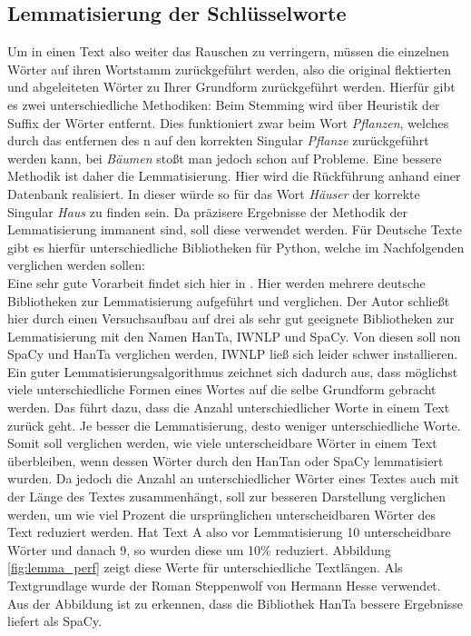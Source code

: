 \subsection{Lemmatisierung der Schlüsselworte}
Um in einen Text also weiter das Rauschen zu verringern, müssen die einzelnen Wörter auf ihren Wortstamm zurückgeführt werden, also die original flektierten und abgeleiteten Wörter zu Ihrer Grundform zurückgeführt werden. Hierfür gibt es zwei unterschiedliche Methodiken: Beim Stemming wird über Heuristik der Suffix der Wörter entfernt. Dies funktioniert zwar beim Wort \textit{Pflanzen}, welches durch das entfernen des n auf den korrekten Singular \textit{Pflanze} zurückgeführt werden kann, bei \textit{Bäumen} stoßt man jedoch schon auf Probleme. Eine bessere Methodik ist daher die Lemmatisierung. Hier wird die Rückführung anhand einer Datenbank realisiert. In dieser würde so für das Wort \textit{Häuser} der korrekte Singular \textit{Haus} zu finden sein. Da präzisere Ergebnisse der Methodik der Lemmatisierung immanent sind, soll diese verwendet werden. Für Deutsche Texte gibt es hierfür unterschiedliche Bibliotheken für Python, welche im Nachfolgenden verglichen werden sollen: \\ \newline
Eine sehr gute Vorarbeit findet sich hier in \cite{lemma}. Hier werden mehrere deutsche Bibliotheken zur Lemmatisierung aufgeführt und verglichen. Der Autor schließt hier durch einen Versuchsaufbau auf drei als sehr gut geeignete Bibliotheken zur Lemmatisierung mit den Namen HanTa, IWNLP  und SpaCy. Von diesen soll non SpaCy und HanTa verglichen werden, IWNLP ließ sich leider schwer installieren.\\ \newline
Ein guter Lemmatisierungsalgorithmus zeichnet sich dadurch aus, dass möglichst viele unterschiedliche Formen eines Wortes auf die selbe Grundform gebracht werden. Das führt dazu, dass die Anzahl unterschiedlicher Worte in einem Text zurück geht. Je besser die Lemmatisierung, desto weniger unterschiedliche Worte. Somit soll verglichen werden, wie viele unterscheidbare Wörter in einem Text überbleiben, wenn dessen Wörter durch den HanTan oder SpaCy lemmatisiert wurden. Da jedoch die Anzahl an unterschiedlicher Wörter eines Textes auch mit der Länge des Textes zusammenhängt, soll zur besseren Darstellung verglichen werden, um wie viel Prozent die ursprünglichen unterscheidbaren Wörter des Text reduziert werden. Hat Text A also vor Lemmatisierung 10 unterscheidbare Wörter und danach 9, so wurden diese um 10\% reduziert. Abbildung \ref{fig:lemma_perf} zeigt diese Werte für unterschiedliche Textlängen. Als Textgrundlage wurde der Roman Steppenwolf von Hermann Hesse verwendet. Aus der Abbildung ist zu erkennen, dass die Bibliothek HanTa bessere Ergebnisse liefert als SpaCy. \\ \newline 
